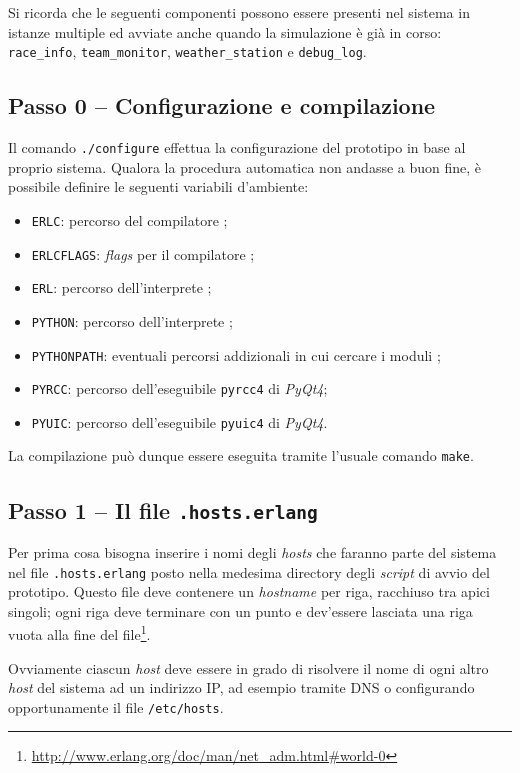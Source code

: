 Si ricorda che le seguenti componenti possono essere presenti nel sistema in istanze multiple ed avviate anche quando la simulazione è già in corso: \texttt{race\_info}, \texttt{team\_monitor}, \texttt{weather\_station} e \texttt{debug\_log}.

\subsection*{Passo 0 -- Configurazione e compilazione}
Il comando \texttt{./configure} effettua la configurazione del prototipo in base al proprio sistema. Qualora la procedura automatica non andasse a buon fine, è possibile definire le seguenti variabili d'ambiente:
\begin{itemize}
\item \texttt{ERLC}: percorso del compilatore \Erlang{};
\item \texttt{ERLCFLAGS}: \textsl{flags} per il compilatore \Erlang{};
\item \texttt{ERL}: percorso dell'interprete \Erlang{};
\item \texttt{PYTHON}: percorso dell'interprete \Python{};
\item \texttt{PYTHONPATH}: eventuali percorsi addizionali in cui cercare i moduli \Python{};
\item \texttt{PYRCC}: percorso dell'eseguibile \texttt{pyrcc4} di \textsl{PyQt4};
\item \texttt{PYUIC}: percorso dell'eseguibile \texttt{pyuic4} di \textsl{PyQt4}.
\end{itemize}
La compilazione può dunque essere eseguita tramite l'usuale comando \texttt{make}.

\subsection*{Passo 1 -- Il file \texttt{.hosts.erlang}}
Per prima cosa bisogna inserire i nomi degli \textit{hosts} che faranno parte del sistema nel file \texttt{.hosts.erlang} posto nella medesima directory degli \textit{script} di avvio del prototipo. Questo file deve contenere un \textit{hostname} per riga, racchiuso tra apici singoli; ogni riga deve terminare con un punto e dev'essere lasciata una riga vuota alla fine del file\footnote{\url{http://www.erlang.org/doc/man/net_adm.html\#world-0}}.

Ovviamente ciascun \textit{host} deve essere in grado di risolvere il nome di ogni altro \textit{host} del sistema ad un indirizzo IP, ad esempio tramite DNS o configurando opportunamente il file \texttt{/etc/hosts}.

